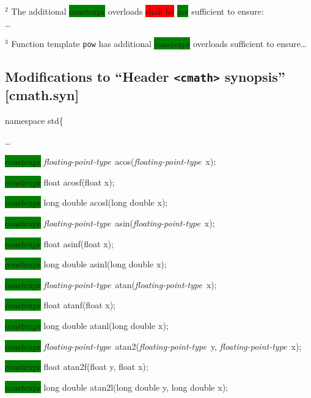 \documentclass[prd,twocolumn,amsmath,amssymb,nofootinbib,eqsecnum]{revtex4-1}
\newcommand{\code}[1]{{\tt #1}}
\newcommand{\header}[1]{{\tt <#1>}}
\newcommand{\highlight}[1]{\colorbox{green}{\!\!\!\! #1}}
\newcommand{\remove}[1]{\colorbox{red}{\!\!\!\! #1}}
\newcommand{\fptype}{{\it floating-point-type}}
\begin{document}
$^2$ The additional \highlight{constexpr} overloads \remove{shall be} \highlight{are} sufficient to ensure:
\\
\ldots

$^3$ Function template \code{pow} has additional \highlight{constexpr} overloads sufficient to ensure\ldots


\subsection{Modifications to  ``Header \header{cmath} synopsis'' [cmath.syn]}


\code{

namespace std\{

\vspace{2ex}
\ldots
\vspace{2ex}


\highlight{constexpr} \fptype\ acos(\fptype\ x);

\highlight{constexpr} float acosf(float x);

\highlight{constexpr} long double acosl(long double x);

\vspace{2ex}


\highlight{constexpr} \fptype\ asin(\fptype\ x);

\highlight{constexpr} float asinf(float x);

\highlight{constexpr} long double asinl(long double x);

\vspace{2ex}


\highlight{constexpr} \fptype\ atan(\fptype\ x);

\highlight{constexpr} float atanf(float x);

\highlight{constexpr} long double atanl(long double x);

\vspace{2ex}


\highlight{constexpr} \fptype\ atan2(\fptype\ y, \fptype\ x);

\highlight{constexpr} float atan2f(float y, float x);

\highlight{constexpr} long double atan2l(long double y, long double x);

\vspace{2ex}

}
\end{document}

